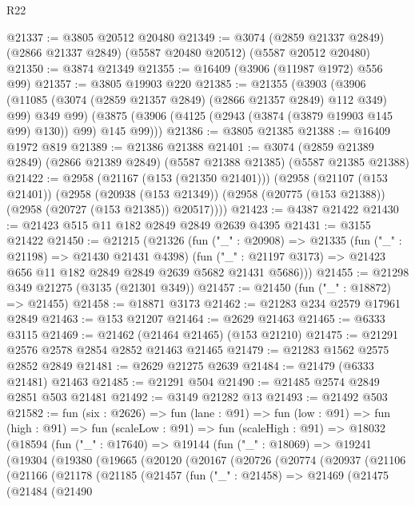 \begin{lexlean}{R22}
\begin{coremodule}
@21337 := @3805 @20512 @20480
@21349 := @3074
    (@2859 @21337 @2849)
    (@2866 @21337 @2849)
    (@5587 @20480 @20512)
    (@5587 @20512 @20480)
@21350 := @3874 @21349
@21355 := @16409 (@3906 (@11987 @1972) @556 @99)
@21357 := @3805 @19903 @220
@21385 := @21355
    (@3903
      (@3906 (@11085 (@3074 (@2859 @21357 @2849) (@2866 @21357 @2849) @112 @349) @99) @349 @99)
      (@3875 (@3906 (@4125 (@2943 (@3874 (@3879 @19903 @145 @99) @130)) @99) @145 @99)))
@21386 := @3805 @21385
@21388 := @16409 @1972 @819
@21389 := @21386 @21388
@21401 := @3074
    (@2859 @21389 @2849)
    (@2866 @21389 @2849)
    (@5587 @21388 @21385)
    (@5587 @21385 @21388)
@21422 := @2958
    (@21167 (@153 (@21350 @21401)))
    (@2958
      (@21107 (@153 @21401))
      (@2958
        (@20938 (@153 @21349))
        (@2958 (@20775 (@153 @21388)) (@2958 (@20727 (@153 @21385)) @20517))))
@21423 := @4387 @21422
@21430 := @21423 @515 @11 @182 @2849 @2849 @2639 @4395
@21431 := @3155 @21422
@21450 := @21215
    (@21326
      (fun ("_" : @20908) =>
      @21335
        (fun ("_" : @21198) => @21430 @21431 @4398)
        (fun ("_" : @21197 @3173) => @21423 @656 @11 @182 @2849 @2849 @2639 @5682 @21431 @5686)))
@21455 := @21298 @349 @21275 (@3135 (@21301 @349))
@21457 := @21450 (fun ("_" : @18872) => @21455)
@21458 := @18871 @3173
@21462 := @21283 @234 @2579 @17961 @2849
@21463 := @153 @21207
@21464 := @2629 @21463
@21465 := @6333 @3115
@21469 := @21462 (@21464 @21465) (@153 @21210)
@21475 := @21291 @2576 @2578 @2854 @2852 @21463 @21465
@21479 := @21283 @1562 @2575 @2852 @2849
@21481 := @2629 @21275 @2639
@21484 := @21479 (@6333 @21481) @21463
@21485 := @21291 @504
@21490 := @21485 @2574 @2849 @2851 @503 @21481
@21492 := @3149 @21282 @13
@21493 := @21492 @503
@21582 := fun (six : @2626) =>
  fun (lane : @91) =>
  fun (low : @91) =>
  fun (high : @91) =>
  fun (scaleLow : @91) =>
  fun (scaleHigh : @91) =>
  @18032
    (@18594
      (fun ("_" : @17640) =>
      @19144
        (fun ("_" : @18069) =>
        @19241
          (@19304
            (@19380
              (@19665
                (@20120
                  (@20167
                    (@20726
                      (@20774
                        (@20937
                          (@21106
                            (@21166
                              (@21178
                                (@21185
                                  (@21457
                                    (fun ("_" : @21458) =>
                                    @21469
                                      (@21475
                                        (@21484
                                          (@21490

\end{coremodule}
\end{lexlean}

